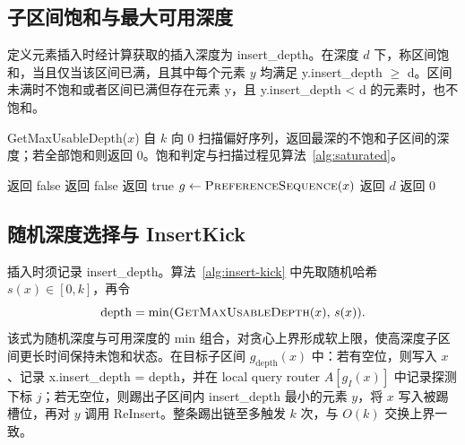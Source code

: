 \subsection{子区间饱和与最大可用深度}

定义元素插入时经计算获取的插入深度为 insert\_depth。在深度 \(d\) 下，称区间饱和，当且仅当该区间已满，且其中每个元素 \(y\) 均满足 y.insert\_depth \(\ge\) d。区间未满时不饱和或者区间已满但存在元素 y，且 y.insert\_depth < d 的元素时，也不饱和。

GetMaxUsableDepth(\(x\)) 自 \(k\) 向 0 扫描偏好序列，返回最深的不饱和子区间的深度；若全部饱和则返回 0。饱和判定与扫描过程见算法~\ref{alg:saturated}。

\begin{algorithm}[htbp]
  \caption{IsSaturated 与 GetMaxUsableDepth}
  \label{alg:saturated}
  \begin{algorithmic}[1]
       \State 返回 false \EndIf
         \State 返回 false \EndIf
      \EndFor
      \State 返回 true
    \EndFunction
      \State $g\gets\Call{PreferenceSequence}{x}$
          \State 返回 $d$
        \EndIf
      \EndFor
      \State 返回 $0$
    \EndFunction
  \end{algorithmic}
\end{algorithm}

\subsection{随机深度选择与 InsertKick}

插入时须记录 insert\_depth。算法~\ref{alg:insert-kick} 中先取随机哈希 \(s(x)\in[0,k]\)，再令
\begin{equation}
  \mathrm{depth}=\min(\Call{GetMaxUsableDepth}{x},\,s(x)).
\end{equation}
该式为随机深度与可用深度的 min 组合，对贪心上界形成软上限，使高深度子区间更长时间保持未饱和状态。在目标子区间 \(g_{\mathrm{depth}}(x)\) 中：若有空位，则写入 \(x\)、记录 x.insert\_depth = depth，并在 local query router \(A[g_I(x)]\) 中记录探测下标 \(j\)；若无空位，则踢出子区间内 insert\_depth 最小的元素 \(y\)，将 \(x\) 写入被踢槽位，再对 \(y\) 调用 ReInsert。整条踢出链至多触发 \(k\) 次，与 \(O(k)\) 交换上界一致\cite{bender2022otsh}。

